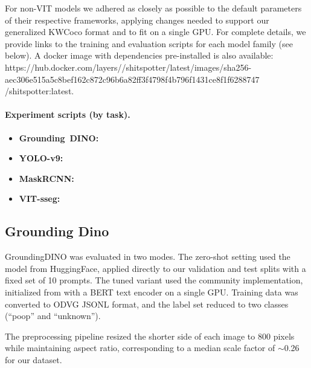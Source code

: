 For non-VIT models we adhered as closely as possible to the default parameters of their respective
  frameworks, applying changes needed to support our generalized KWCoco format and to fit on a single GPU.
For complete details, we provide links to the training and evaluation scripts for each model family (see
  below).
A docker image with dependencies pre-installed is also available:
\dockerimage
  {https://hub.docker.com/layers//shitspotter/latest/images/sha256-aec306e515a5c8bef162c872c96b6a82ff3f4798f4b796f1431ce8f1f6288747}
  {/shitspotter:latest}.

\paragraph{Experiment scripts (by task).}

\begin{itemize}
  \item \textbf{Grounding~DINO:}

  \item \textbf{YOLO-v9:}

  \item \textbf{MaskRCNN:}

  \item \textbf{VIT-sseg:}
\end{itemize}


\subsection{Grounding Dino}

GroundingDINO was evaluated in two modes.
The zero-shot setting used the  model from HuggingFace, applied
  directly to our validation and test splits with a fixed set of 10 prompts.
The tuned variant used the community  implementation, initialized from
  \DINOPretrained{} with a BERT text encoder on a single GPU.
Training data was converted to ODVG JSONL format, and the label set reduced to two classes (``poop'' and
  ``unknown'').

The preprocessing pipeline resized the shorter side of each image to 800 pixels while maintaining aspect
  ratio, corresponding to a median scale factor of $\sim$0.26 for our dataset.

